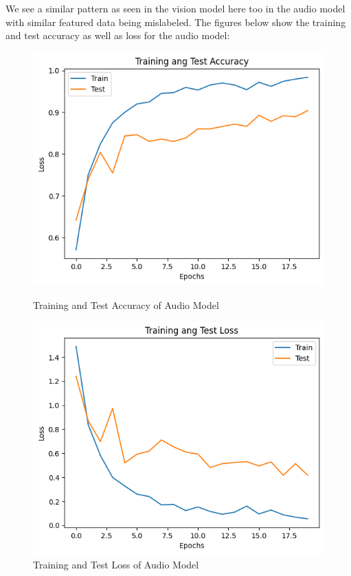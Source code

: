 \documentclass[fleqn, 10pt, twoside]{IOEGC}
\begin{document}
\clearpage
\par
We see a similar pattern as seen in the vision model here too in the audio model with similar featured data being mislabeled.
The figures below show the training and test accuracy as well as loss for the audio model:
\par
\begin{figure}[h]

	\centering
	\includegraphics[scale=0.6]{Graphics/audio_accuracy.png}
	\caption{Training and Test Accuracy of Audio Model}
	\includegraphics[scale=0.6]{Graphics/audio_loss.png}
	\caption{Training and Test Loss of Audio Model}

	\label{fig:enter-label}
\end{figure}
\end{document}
